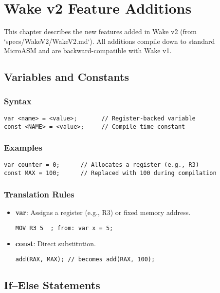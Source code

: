 \documentclass[a4paper,11pt]{book}
\begin{document}
\chapter{Wake v2 Feature Additions}

This chapter describes the new features added in Wake v2 (from `specs/WakeV2/WakeV2.md`). All additions compile down to standard MicroASM and are backward-compatible with Wake v1.

\section{Variables and Constants}
\subsection*{Syntax}
\begin{lstlisting}[language=Wake]
var <name> = <value>;       // Register-backed variable
const <NAME> = <value>;     // Compile-time constant
\end{lstlisting}

\subsection*{Examples}
\begin{lstlisting}[language=Wake]
var counter = 0;      // Allocates a register (e.g., R3)
const MAX = 100;      // Replaced with 100 during compilation
\end{lstlisting}

\subsection*{Translation Rules}
\begin{itemize}
	\item \textbf{var}: Assigns a register (e.g., R3) or fixed memory address.
	\begin{lstlisting}[language=MicroASM]
MOV R3 5  ; from: var x = 5;
	\end{lstlisting}
	\item \textbf{const}: Direct substitution.
	\begin{lstlisting}[language=Wake]
add(RAX, MAX); // becomes add(RAX, 100);
	\end{lstlisting}
\end{itemize}

\section{If--Else Statements}
\end{document}

